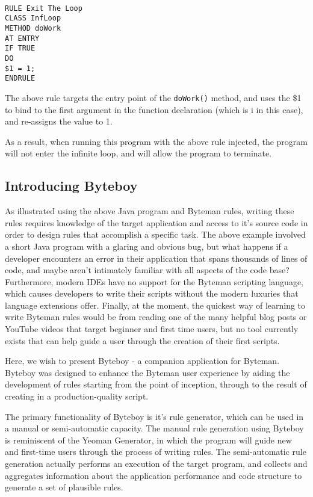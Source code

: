\documentclass[letterpaper,twocolumn,10pt]{article}
\begin{document}
{\tt \small
\begin{verbatim}
RULE Exit The Loop 
CLASS InfLoop
METHOD doWork
AT ENTRY
IF TRUE
DO
$1 = 1;
ENDRULE
\end{verbatim}
}

The above rule targets the entry point of the {\tt doWork()} method, and uses the \$1 to bind to the first argument in the function declaration (which is i in this case), and re-assigns the value to 1. 

As a result, when running this program with the above rule injected, the program will not enter the infinite loop, and will allow the program to terminate.

\subsection{Introducing Byteboy}

As illustrated using the above Java program and Byteman rules, writing these rules requires knowledge of the target application and access to it's source code in order to design rules that accomplish a specific task. The above example involved a short Java program with a glaring and obvious bug, but what happens if a developer encounters an error in their application that spans thousands of lines of code, and maybe aren't intimately familiar with all aspects of the code base? Furthermore, modern IDEs have no support for the Byteman scripting language, which causes developers to write their scripts without the modern luxuries that language extensions offer. Finally, at the moment, the quickest way of learning to write Byteman rules would be from reading one of the many helpful blog posts\cite{bytemanblog} or YouTube videos\cite{bytemanvideo} that target beginner and first time users, but no tool currently exists that can help guide a user through the creation of their first scripts.

Here, we wish to present Byteboy - a companion application for Byteman. Byteboy was designed to enhance the Byteman user experience by aiding the development of rules starting from the point of inception, through to the result of creating in a production-quality script. 

The primary functionality of Byteboy is it's rule generator, which can be used in a manual or semi-automatic capacity. The manual rule generation using Byteboy is reminiscent of the Yeoman Generator\cite{yoman}, in which the program will guide new and first-time users through the process of writing rules. The semi-automatic rule generation actually performs an execution of the target program, and collects and aggregates information about the application performance and code structure to generate a set of plausible rules.   
\end{document}
